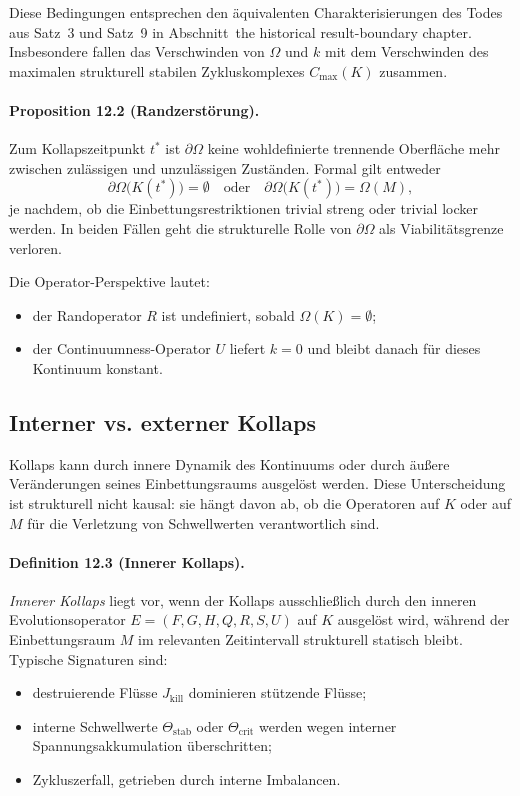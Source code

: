 Diese Bedingungen entsprechen den äquivalenten Charakterisierungen des Todes aus
Satz~3 und Satz~9 in Abschnitt~the historical result-boundary chapter. Insbesondere fallen das
Verschwinden von \(\Omega\) und \(k\) mit dem Verschwinden des maximalen
strukturell stabilen Zykluskomplexes \(C_{\max}(K)\) zusammen.

\paragraph{Proposition 12.2 (Randzerstörung).}
Zum Kollapszeitpunkt \(t^{\ast}\) ist \(\partial\Omega\) keine wohldefinierte
trennende Oberfläche mehr zwischen zulässigen und unzulässigen Zuständen.
Formal gilt entweder
\begin{equation}
  \partial\Omega\big(K(t^{\ast})\big) = \emptyset
  \quad\text{oder}\quad
  \partial\Omega\big(K(t^{\ast})\big) = \Omega(M),
\end{equation}
je nachdem, ob die Einbettungsrestriktionen trivial streng oder trivial locker
werden. In beiden Fällen geht die strukturelle Rolle von \(\partial\Omega\)
als Viabilitätsgrenze verloren.

Die Operator-Perspektive lautet:
\begin{itemize}
  \item der Randoperator \(R\) ist undefiniert, sobald \(\Omega(K)=\emptyset\);
  \item der Continuumness-Operator \(U\) liefert \(k=0\) und bleibt danach für
        dieses Kontinuum konstant.
\end{itemize}

\subsection{Interner vs. externer Kollaps}

Kollaps kann durch innere Dynamik des Kontinuums oder durch äußere Veränderungen
seines Einbettungsraums ausgelöst werden. Diese Unterscheidung ist strukturell
nicht kausal: sie hängt davon ab, ob die Operatoren auf \(K\) oder auf \(M\) für
die Verletzung von Schwellwerten verantwortlich sind.

\paragraph{Definition 12.3 (Innerer Kollaps).}
\emph{Innerer Kollaps} liegt vor, wenn der Kollaps ausschließlich durch den
inneren Evolutionsoperator \(E=(F,G,H,Q,R,S,U)\) auf \(K\) ausgelöst wird,
während der Einbettungsraum \(M\) im relevanten Zeitintervall strukturell
statisch bleibt. Typische Signaturen sind:
\begin{itemize}
  \item destruierende Flüsse \(J_{\mathrm{kill}}\) dominieren stützende Flüsse;
  \item interne Schwellwerte \(\Theta_{\mathrm{stab}}\) oder
        \(\Theta_{\mathrm{crit}}\) werden wegen interner Spannungsakkumulation
        überschritten;
  \item Zykluszerfall, getrieben durch interne Imbalancen.
\end{itemize}

